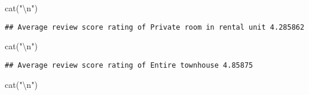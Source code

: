 \documentclass[
]{article}
\newenvironment{Shaded}{\begin{snugshade}}{\end{snugshade}}
\newcommand{\FunctionTok}[1]{\textcolor[rgb]{0.00,0.00,0.00}{#1}}
\newcommand{\NormalTok}[1]{#1}
\newcommand{\OtherTok}[1]{\textcolor[rgb]{0.56,0.35,0.01}{#1}}
\newcommand{\SpecialCharTok}[1]{\textcolor[rgb]{0.00,0.00,0.00}{#1}}
\newcommand{\StringTok}[1]{\textcolor[rgb]{0.31,0.60,0.02}{#1}}
\begin{document}
\begin{Shaded}
\begin{Highlighting}[]
\FunctionTok{cat}\NormalTok{(}\StringTok{"}\SpecialCharTok{\textbackslash{}n}\StringTok{"}\NormalTok{)}
\end{Highlighting}
\end{Shaded}

\begin{Shaded}
\end{Shaded}

\begin{verbatim}
## Average review score rating of Private room in rental unit 4.285862
\end{verbatim}

\begin{Shaded}
\begin{Highlighting}[]
\FunctionTok{cat}\NormalTok{(}\StringTok{"}\SpecialCharTok{\textbackslash{}n}\StringTok{"}\NormalTok{)}
\end{Highlighting}
\end{Shaded}

\begin{Shaded}
\end{Shaded}

\begin{verbatim}
## Average review score rating of Entire townhouse 4.85875
\end{verbatim}

\begin{Shaded}
\begin{Highlighting}[]
\FunctionTok{cat}\NormalTok{(}\StringTok{"}\SpecialCharTok{\textbackslash{}n}\StringTok{"}\NormalTok{)}
\end{Highlighting}
\end{Shaded}
\end{document}
